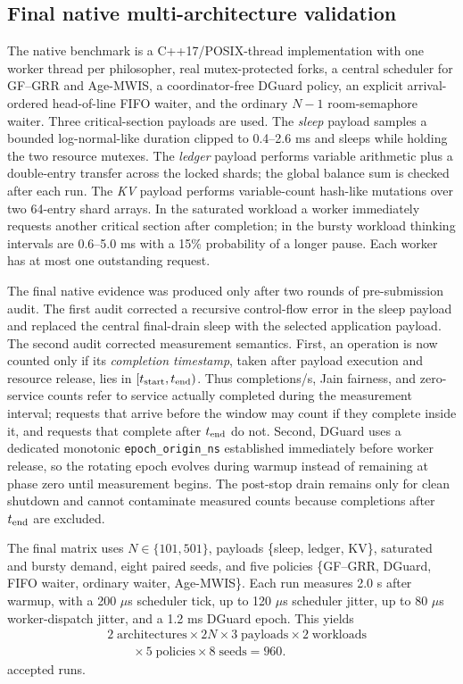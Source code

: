 \documentclass[10pt,journal]{IEEEtran}
\begin{document}
\subsection{Final native multi-architecture validation}
The native benchmark is a C++17/POSIX-thread implementation with one worker thread per philosopher, real mutex-protected forks, a central scheduler for GF--GRR and Age-MWIS, a coordinator-free DGuard policy, an explicit arrival-ordered head-of-line FIFO waiter, and the ordinary $N-1$ room-semaphore waiter. Three critical-section payloads are used. The \emph{sleep} payload samples a bounded log-normal-like duration clipped to 0.4--2.6 ms and sleeps while holding the two resource mutexes. The \emph{ledger} payload performs variable arithmetic plus a double-entry transfer across the locked shards; the global balance sum is checked after each run. The \emph{KV} payload performs variable-count hash-like mutations over two 64-entry shard arrays. In the saturated workload a worker immediately requests another critical section after completion; in the bursty workload thinking intervals are 0.6--5.0 ms with a 15\% probability of a longer pause. Each worker has at most one outstanding request.

The final native evidence was produced only after two rounds of pre-submission audit. The first audit corrected a recursive control-flow error in the sleep payload and replaced the central final-drain sleep with the selected application payload. The second audit corrected measurement semantics. First, an operation is now counted only if its \emph{completion timestamp}, taken after payload execution and resource release, lies in $[t_{\rm start},t_{\rm end})$. Thus completions/s, Jain fairness, and zero-service counts refer to service actually completed during the measurement interval; requests that arrive before the window may count if they complete inside it, and requests that complete after $t_{\rm end}$ do not. Second, DGuard uses a dedicated monotonic \texttt{epoch\_origin\_ns} established immediately before worker release, so the rotating epoch evolves during warmup instead of remaining at phase zero until measurement begins. The post-stop drain remains only for clean shutdown and cannot contaminate measured counts because completions after $t_{\rm end}$ are excluded.

The final matrix uses $N\in\{101,501\}$, payloads \{sleep, ledger, KV\}, saturated and bursty demand, eight paired seeds, and five policies \{GF--GRR, DGuard, FIFO waiter, ordinary waiter, Age-MWIS\}. Each run measures 2.0 s after warmup, with a 200 $\mu$s scheduler tick, up to 120 $\mu$s scheduler jitter, up to 80 $\mu$s worker-dispatch jitter, and a 1.2 ms DGuard epoch. This yields
\begin{align*}
&2\;\text{architectures}\times 2N\times 3\;\text{payloads}\times 2\;\text{workloads}\\
&\qquad\times 5\;\text{policies}\times 8\;\text{seeds}=960.
\end{align*}
accepted runs.
\end{document}

